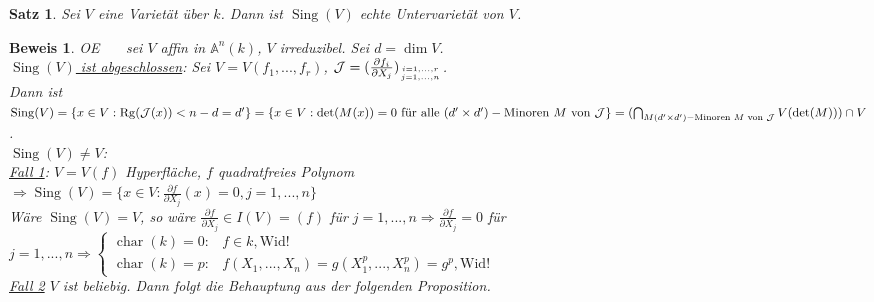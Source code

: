 \documentclass[a4paper,12pt]{report}
\theoremstyle{break}
\newtheorem{Satz}{Satz}
\theoremstyle{nonumberbreak}
\theoremstyle{nonumberplain}
\newtheorem{Bew}{Beweis}
\renewcommand{\OE}{O\!\!E~}
\begin{document}
\begin{Satz}
\label{satz:5}
Sei $V$ eine Varietät über $k$. Dann ist $\operatorname{Sing}(V)$ echte Untervarietät von $V$.
\end{Satz}

\begin{Bew}
\OE~~ sei $V$ affin in $\mathbb{A}^n(k)$, $V$ irreduzibel. Sei $d=\dim V$.\\
\underline{$\operatorname{Sing}(V)$ ist abgeschlossen}: Sei $V=V(f_1,...,f_r)$, $\mathcal{J}=(\frac{\partial f_i}{\partial X_j})_{i=1,...,r\atop j=1,...,n}$.\\
Dann ist $\operatorname{Sing}(V)=\{x\in V:\operatorname{Rg}(\mathcal{J}(x))<n-d=d'\}=\\
\{x\in V:\det (M(x))=0 \text{ für alle } (d'\times d')-\text{Minoren } M \text{ von } \mathcal{J}\}=\\
(\bigcap_{M(d'\times d')-\text{Minoren } M \text{ von } \mathcal{J}}V(\det(M)))\cap V$.\\
\underline{$\operatorname{Sing}(V)\neq V$}:\\
\underline{Fall 1}: $V=V(f)$ Hyperfläche, $f$ quadratfreies Polynom\\ $\Rightarrow\operatorname{Sing}(V)=\{x\in V:\frac{\partial f}{\partial X_j}(x)=0, j=1,...,n\}$\\
Wäre $\operatorname{Sing}(V)=V$, so wäre $\frac{\partial f}{\partial X_j}\in I(V)=(f)$ für $j=1,...,n\Rightarrow\frac{\partial f}{\partial X_j}=0$ für $j=1,...,n\Rightarrow
\begin{cases}
\operatorname{char}(k)=0:&f\in k, \text{Wid!}\\
\operatorname{char}(k)=p:&f(X_1,...,X_n)=g(X_1^p,...,X_n^p)=g^p, \text{Wid!}
\end{cases}$\\
\underline{Fall 2} $V$ ist beliebig. Dann folgt die Behauptung aus der folgenden Proposition.
\end{Bew}
\end{document}
